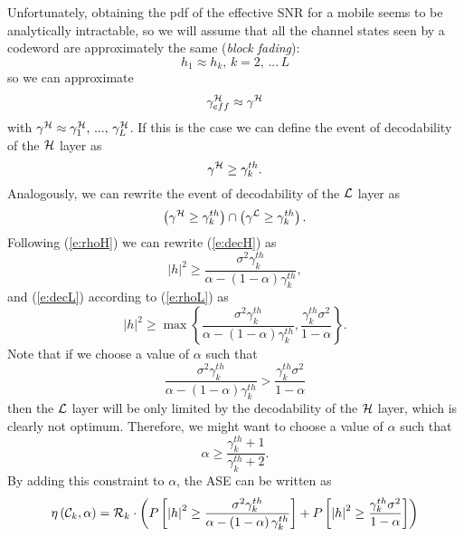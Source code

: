 \documentclass[journal,onecolumn,10pt,a4paper]{IEEEtran}
\begin{document}
Unfortunately, obtaining the pdf of the effective SNR for a mobile seems to be analytically intractable, so we will assume that all the channel states seen by a codeword are approximately the same ({\it block fading}): 
\begin{equation}
 h_1 \approx h_k,\, k=2,\,...\, L
\end{equation}
so we can approximate
\begin{equation}
 \gamma_{eff}^{\cal H} \approx \gamma^{\cal H}
\end{equation}
with $\gamma^{\cal H} \approx \gamma_1^{\cal H},\,...,\,\gamma_L^{\cal H}$.
If this is the case we can define the event of decodability of the ${\cal H}$ layer as
\begin{equation}
\label{e:decH}
 \gamma^{\cal H} \geq \gamma_k^{th}.
\end{equation}
Analogously, we can rewrite the event of decodability of the ${\cal L}$ layer as
\begin{equation}
\label{e:decL}
 \left( \gamma^{\cal H} \geq \gamma_k^{th }\right) \cap \left( \gamma^{\cal L} \geq \gamma_k^{th }\right).
\end{equation}
Following (\ref{e:rhoH}) we can rewrite (\ref{e:decH}) as
\begin{equation}
 \left| h \right|^2 \geq \frac{\sigma^2 \gamma_k^{th}}{\alpha - \left( 1-\alpha\right)\gamma_k^{th}},
\end{equation}
and (\ref{e:decL}) according to (\ref{e:rhoL})  as
\begin{equation}
 \left| h \right|^2 \geq \max \left\{\frac{\sigma^2 \gamma_k^{th}}{\alpha - \left( 1-\alpha\right)\gamma_k^{th}}, \frac{\gamma_k^{th}\sigma^2}{1-\alpha} \right\}.
\end{equation}
Note that if we choose a value of $\alpha$ such that 
\begin{equation}
 \frac{\sigma^2 \gamma_k^{th}}{\alpha - \left( 1-\alpha\right)\gamma_k^{th}} > \frac{\gamma_k^{th}\sigma^2}{1-\alpha}
\end{equation}
then the ${\cal L}$ layer will be only limited by the decodability of the ${\cal H}$ layer, which is clearly not optimum. Therefore, we might want to choose a value of $\alpha$ such that
\begin{equation}
 \alpha \geq \frac{\gamma_{k}^{th}+1}{\gamma_{k}^{th}+2}.
\end{equation}
By adding this constraint to $\alpha$, the ASE can be written as
\begin{equation}
 \eta\left({\cal C}_k, \alpha \right) = \mathcal{R}_k\cdot \left( P\left[  \left| h \right|^2 \geq \frac{\sigma^2 \gamma_k^{th}}{\alpha - \left( 1-\alpha\right)\gamma_k^{th}} \right] + P\left[ \left| h \right|^2 \geq \frac{\gamma_k^{th}\sigma^2}{1-\alpha} \right] \right)
\end{equation}
\end{document}
